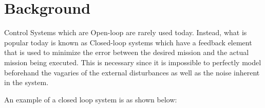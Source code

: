 \section{Background}
Control Systems which are Open-loop are rarely used today. Instead, what is popular today is known as Closed-loop systems which have a feedback element that is used to minimize the error between the desired mission and the actual mission being executed. This is necessary since it is impossible to perfectly model beforehand the vagaries of the external disturbances as well as the noise inherent in the system.

An example of a closed loop system is as shown below:

